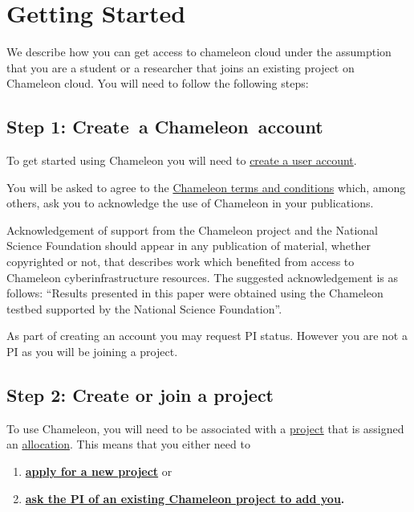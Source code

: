 
\section{Getting Started}
\label{C:cc-start}

\FILENAME

We describe how you can get access to chameleon cloud under the
assumption that you are a student or a researcher that joins an
existing project on Chameleon cloud. You will need to follow the
following steps:

\subsection{Step 1: Create~a Chameleon~account}

To get started using Chameleon you will need to
\href{https://www.chameleoncloud.org/register}{create a user account}.

You will be asked to agree to the
\href{https://www.chameleoncloud.org/terms/view/chameleon-user-terms/}{Chameleon
  terms and conditions} which, among others, ask you to acknowledge
the use of Chameleon in your publications. 

Acknowledgement of support from the Chameleon project and the
National Science Foundation should appear in any publication of
material, whether copyrighted or not, that describes work which
benefited from access to Chameleon cyberinfrastructure resources. The
suggested acknowledgement is as follows: ``Results presented in this
paper were obtained using the Chameleon testbed supported by the
National Science Foundation''.

\begin{IU}
  As part of creating an account you may request PI status. However
  you are not a PI as you will be joining a project.
\end{IU}

\subsection{Step 2: Create or join a project}

To use Chameleon, you will need to be associated with a
\href{https://www.chameleoncloud.org/docs/user-faq/\#toc-how-do-i-apply-for-a-chameleon-project-}{project}
that is assigned an
\href{https://www.chameleoncloud.org/docs/user-faq/\#toc-what-are-the-project-allocation-sizes-and-limits-}{allocation}.
This means that you either need to

\begin{enumerate}

\item \textbf{\href{https://www.chameleoncloud.org/user/projects/new/}{apply
for a new project}} or 

\item
\textbf{\href{https://www.chameleoncloud.org/docs/user-faq/\#toc-my-pi-professor-colleague-already-has-a-chameleon-project-how-do-i-get-added-as-a-user-on-the-project-}{ask
the PI of an existing Chameleon project to add you}.}

\end{enumerate}

